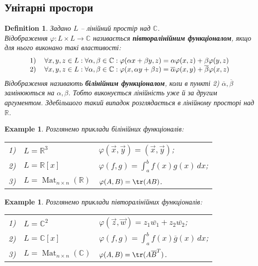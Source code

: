 \documentclass[a4paper, 10pt]{article}
\theoremstyle{theoremdd}
\newtheorem{definition}[theorem]{Definition}
\newtheorem{example}[theorem]{Example}
\DeclareMathOperator{\Mat}{Mat}
\begin{document}
\subsection{Унітарні простори}
\begin{definition}
\label{def_sesquilinear_functional}
Задано $L$ -- лінійний простір над $\mathbb{C}$.\\
Відображення $\varphi \colon L \times L \to \mathbb{C}$ називається \textbf{півторалінійним функціоналом}, якщо для нього виконано такі властивості:
\begin{align*}
\begin{tabular}{cl}
1) & $\forall x,y,z \in L: \forall \alpha,\beta \in \mathbb{C}: \varphi (\alpha x + \beta y, z) = \alpha \varphi (x,z) + \beta \varphi (y,z)$\\
2) & $\forall x,y,z \in L: \forall \alpha, \beta \in \mathbb{C}: \varphi (x, \alpha y + \beta z) = \overline{\alpha} \varphi (x,y) + \overline{\beta} \varphi (x,z)$\\
	\end{tabular}
\end{align*}
Відображення називають \textbf{білінійним функціоналом}, коли в пункті 2) $\overline{\alpha},\overline{\beta}$ замінюються на $\alpha,\beta$. Тобто виконується лінійність уже й за другим аргументом. Здебільшого такий випадок розглядається в лінійному просторі над $\mathbb{R}$.
\end{definition}

\begin{example}
\label{bilinear_functional}
Розглянемо приклади білінійних функціоналів:\\
\begin{tabular}{cll}
1) & $L = \mathbb{R}^3$ & $\varphi(\vec{x},\vec{y}) = (\vec{x},\vec{y})$;\\
2) & $L = \mathbb{R}[x]$ & $\varphi(f,g) = \displaystyle \int_a^b f(x)g(x)\,dx$;\\
3) & $L = \Mat_{n \times n}(\mathbb{R})$ & $\varphi(A,B) = \tr(AB)$.
\end{tabular}
\end{example}

\begin{example}
\label{one_half_functional}
Розглянемо приклади півторалінійних функціоналів:\\
\begin{tabular}{cll}
1) & $L = \mathbb{C}^2$ & $\varphi(\vec{z},\vec{w}) = z_1 \overline{w_1} + z_2 \overline{w_2}$;\\
2) & $L = \mathbb{C}[x]$ & $\varphi(f,g) = \displaystyle \int_a^b f(x) \overline{g}(x)\,dx$;\\
3) & $L = \Mat_{n \times n}(\mathbb{C})$ & $\varphi(A,B) = \tr(A \overline{B}^T)$.
\end{tabular}
\end{example}
\end{document}
